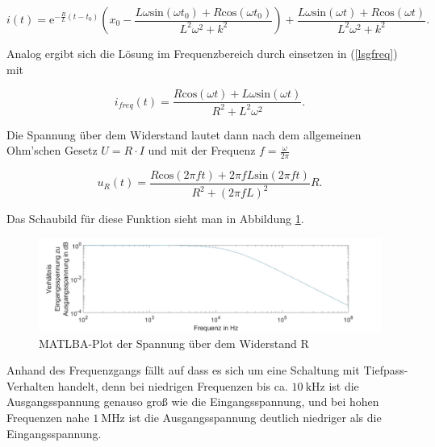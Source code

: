 \begin{equation*}
	i(t) = \mathrm{e}^{-\frac{R}{L}(t-t_0)}\left(x_0-\frac{L\omega \mathrm{sin}(\omega t_0)+R\mathrm{cos}(\omega t_0)}{L^2\omega^2+k^2}\right)+\frac{L\omega \mathrm{sin}(\omega t)+R\mathrm{cos}(\omega t)}{L^2\omega^2+k^2}.
\end{equation*}

Analog ergibt sich die Lösung im Frequenzbereich durch einsetzen in (\ref{lsgfreq}) mit

\begin{equation*}
	i_{freq} (t) = \frac{R\mathrm{cos}(\omega t) + L\omega\mathrm{sin}(\omega t)}{R^2+ L^2\omega^2}.
\end{equation*}

Die Spannung über dem Widerstand lautet dann nach dem allgemeinen Ohm'schen Gesetz $U=R\cdot I$ und mit der Frequenz $f=\frac{\omega}{2\pi}$

\begin{equation*}
u_{R} (t) = \frac{R\mathrm{cos}(2\pi ft) + 2\pi fL\mathrm{sin}(2\pi ft)}{R^2+ (2\pi fL)^2}R.
\end{equation*}

Das Schaubild für diese Funktion sieht man in Abbildung \ref{spannungplot}.

\begin{figure}[h]
	\includegraphics[width=\textwidth]{data/nocheinversuch.jpg}
	\caption{MATLBA-Plot der Spannung über dem Widerstand R}
	\label{spannungplot}
\end{figure}

Anhand des Frequenzgangs fällt auf dass es sich um eine Schaltung mit Tiefpass-Verhalten handelt, denn bei niedrigen Frequenzen bis ca. $\SI{10}{\kilo\hertz}$ ist die Ausgangsspannung genauso groß wie die Eingangsspannung, und bei hohen Frequenzen nahe $\SI{1}{\mega \hertz}$ ist die Ausgangsspannung deutlich niedriger als die Eingangsspannung.




